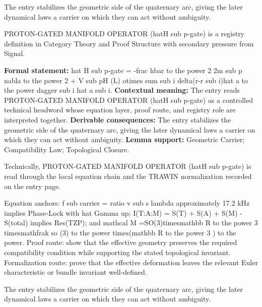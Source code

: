 The entry stabilizes the geometric side of the quaternary arc, giving the later dynamical laws a carrier on which they can act without ambiguity.
\clearpage


\begingroup\small
{}
PROTON-GATED MANIFOLD OPERATOR (hatH sub p-gate) is a registry definition in Category Theory and Proof Structure with secondary pressure from Signal.

\begingroup\footnotesize\setlength{\emergencystretch}{3em}\sloppy
\textbf{Formal statement:} hat H sub p-gate = -frac hbar to the power 2 2m sub p nabla to the power 2 + V sub pH (L) otimes sum sub i delta(r-r sub i)hat a to the power dagger sub i hat a sub i. \textbf{Contextual meaning:} The entry reads PROTON-GATED MANIFOLD OPERATOR (hatH sub p-gate) as a controlled technical headword whose equation layer, proof route, and registry role are interpreted together. \textbf{Derivable consequences:} The entry stabilizes the geometric side of the quaternary arc, giving the later dynamical laws a carrier on which they can act without ambiguity. \textbf{Lemma support:} Geometric Carrier; Compatibility Law; Topological Closure.\par
\endgroup

Technically, PROTON-GATED MANIFOLD OPERATOR (hatH sub p-gate) is read through the local equation chain and the TRAWIN normalization recorded on the entry page.

Equation anchors: f sub carrier = ratio v sub s lambda approximately 17.2 kHz implies Phase-Lock with hat Gamma up; I(T:A:M) = S(T) + S(A) + S(M) - S(total) implies Res(TZP); and mathcal M =SO(3)timesmathbb R to the power 3 timesmathfrak so (3) to the power times(mathbb R to the power 3 ) to the power. Proof route: show that the effective geometry preserves the required compatibility condition while supporting the stated topological invariant. Formalization route: prove that the effective deformation leaves the relevant Euler characteristic or bundle invariant well-defined.

The entry stabilizes the geometric side of the quaternary arc, giving the later dynamical laws a carrier on which they can act without ambiguity.
\endgroup

